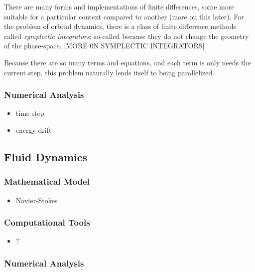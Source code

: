 \documentclass{report}
\begin{document}
            There are many forms and implementations of finite differences, some more suitable for a particular context compared to another (more on this later).  For the problem of orbital dynamics, there is a class of finite difference methods called \emph{symplectic integrators}; so-called because they do not change the geometry of the phase-space. [MORE 0N SYMPLECTIC INTEGRATORS]

            Because there are so many terms and equations, and each term is only needs the current step, this problem naturally lends itself to being parallelized.

        \subsubsection{Numerical Analysis}

            \begin{itemize}
                \item time step
                \item energy drift
            \end{itemize}

    \subsection{Fluid Dynamics}

        \subsubsection{Mathematical Model}

            \begin{itemize}
                \item Navier-Stokes
            \end{itemize}

        \subsubsection{Computational Tools}

            \begin{itemize}
                \item ?
            \end{itemize}

        \subsubsection{Numerical Analysis}
\end{document}
